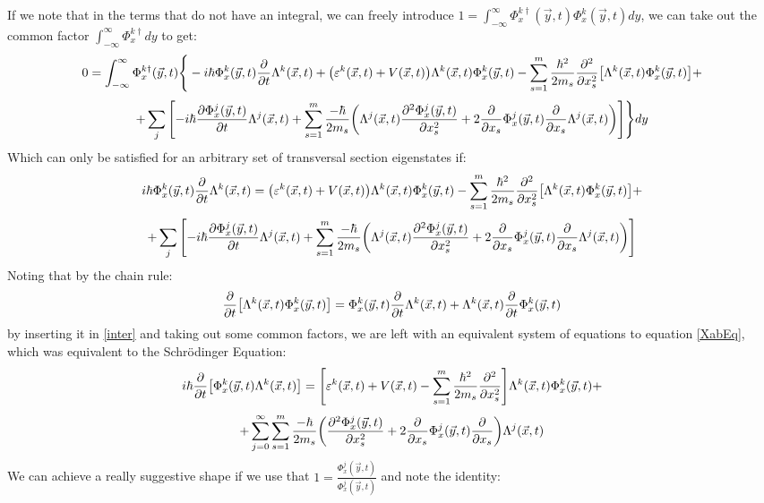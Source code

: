 \documentclass[11pt, a4paper]{article} %
\begin{document}
If we note that in the terms that do not have an integral, we can freely introduce $1=\int_{-\infty}^\infty \Phi^{k\dagger}_x(\vec{y},t) \Phi^k_x(\vec{y},t)dy$, we can take out the common factor $\int_{-\infty}^\infty\Phi^{k\dagger}_x dy$ to get:
\begin{equation}
0=\int_{-\infty}^\infty\Phi^{k\dagger}_x(\vec{y},t)\Bigg\{ -i\hbar \Phi^k_x(\vec{y},t)\pdv{}{t}\Lambda^k(\vec{x},t)+\qty( \varepsilon^k(\vec{x},t)+V(\vec{x},t) )\Lambda^k(\vec{x},t)\Phi^k_x(\vec{y},t) -\sum_{s=1}^m\frac{\hbar^2}{2m_s}\pdv[2]{}{x_s}\qty[\Lambda^k(\vec{x},t)\Phi^k_x(\vec{y},t) ]+
\end{equation}
$$
+\sum_j\qty[-i\hbar \pdv{\Phi^j_x(\vec{y},t)}{t}\Lambda^j(\vec{x},t)+\sum_{s=1}^m \frac{-\hbar}{2m_s}\qty( \Lambda^j(\vec{x},t)\pdv[2]{\Phi^j_x(\vec{y},t)}{x_s}+2\pdv{}{x_s}\Phi^j_x(\vec{y},t)\pdv{}{x_s}\Lambda^j(\vec{x},t) ) ]\Bigg\}dy
$$
Which can only be satisfied for an arbitrary set of transversal section eigenstates if:
\begin{equation}\label{inter}
 i\hbar \Phi^k_x(\vec{y},t)\pdv{}{t}\Lambda^k(\vec{x},t)=\qty( \varepsilon^k(\vec{x},t)+V(\vec{x},t) )\Lambda^k(\vec{x},t)\Phi^k_x(\vec{y},t) -\sum_{s=1}^m\frac{\hbar^2}{2m_s}\pdv[2]{}{x_s}\qty[\Lambda^k(\vec{x},t)\Phi^k_x(\vec{y},t) ]+
\end{equation}
$$
+\sum_j\qty[-i\hbar \pdv{\Phi^j_x(\vec{y},t)}{t}\Lambda^j(\vec{x},t)+\sum_{s=1}^m \frac{-\hbar}{2m_s}\qty( \Lambda^j(\vec{x},t)\pdv[2]{\Phi^j_x(\vec{y},t)}{x_s}+2\pdv{}{x_s}\Phi^j_x(\vec{y},t)\pdv{}{x_s}\Lambda^j(\vec{x},t) ) ]
$$
Noting that by the chain rule:
\begin{equation}
\pdv{}{t}\qty[\Lambda^k(\vec{x},t)\Phi^k_x(\vec{y},t)]=\Phi^k_x(\vec{y},t)\pdv{}{t}\Lambda^k(\vec{x},t)+\Lambda^k(\vec{x},t)\pdv{}{t}\Phi^k_x(\vec{y},t)
\end{equation}
by inserting it in \eqref{inter} and taking out some common factors, we are left with an equivalent system of equations to equation \eqref{XabEq}, which was equivalent to the Schrödinger Equation:
\begin{equation}\label{inter2}
 i\hbar\pdv{}{t}\qty[ \Phi^k_x(\vec{y},t)\Lambda^k(\vec{x},t)]=\qty[ \varepsilon^k(\vec{x},t)+V(\vec{x},t)  -\sum_{s=1}^m\frac{\hbar^2}{2m_s}\pdv[2]{}{x_s} ]\Lambda^k(\vec{x},t)\Phi^k_x(\vec{y},t)+
\end{equation}
$$
+\sum_{j=0}^\infty\sum_{s=1}^m \frac{-\hbar}{2m_s}\qty( \pdv[2]{\Phi^j_x(\vec{y},t)}{x_s}+2\pdv{}{x_s}\Phi^j_x(\vec{y},t)\pdv{}{x_s} )\Lambda^j(\vec{x},t)
$$
We can achieve a really suggestive shape if we use that $1=\frac{\Phi^j_x(\vec{y},t)}{\Phi^j_x(\vec{y},t)}$ and note the identity:\vspace{-0.2cm}
\end{document}
